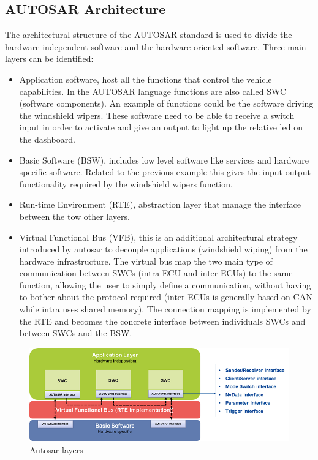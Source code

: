 \documentclass[../main.tex]{subfiles}
\begin{document}
\subsection{AUTOSAR Architecture}
The architectural structure of the AUTOSAR standard is used to divide the hardware-independent software and the hardware-oriented software. Three main layers can be identified:
\begin{itemize}
    \item Application software, host all the functions that control the vehicle capabilities. In the AUTOSAR language functions are also called SWC (software components). An example of functions could be the software driving the windshield wipers. These software need to be able to receive a switch input in order to activate and give an output to light up the relative led on the dashboard. 
    \item Basic Software (BSW), includes low level software like services and hardware specific software. Related to the previous example this gives the input output functionality required by the windshield wipers function. 
    \item Run-time Environment (RTE), abstraction layer that manage the interface between the tow other layers. 
    \item Virtual Functional Bus (VFB), this is an additional architectural strategy introduced by autosar to decouple applications (windshield wiping) from the hardware infrastructure. The virtual bus map the two main type of communication between SWCs (intra-ECU and inter-ECUs) to the same function, allowing the user to simply define a communication, without having to bother about the protocol required (inter-ECUs is generally based on CAN while intra uses shared memory). The connection mapping is implemented by the RTE and becomes the concrete interface between individuals SWCs and between SWCs and the BSW.
\end{itemize}
\begin{figure}[h]
    \centering
    \includegraphics[width=\linewidth]{images_folder/878x-autosar_layers.b68.png}
    \caption{Autosar layers}
    \label{fig:AUTLAY}
\end{figure}
\end{document}
